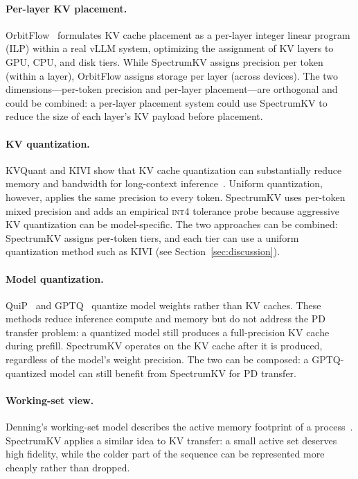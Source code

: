 \documentclass[11pt]{article}
\newcommand{\method}{SpectrumKV}
\newcommand{\intiv}{\textsc{int4}}
\theoremstyle{plain}
\theoremstyle{definition}
\begin{document}
\paragraph{Per-layer KV placement.}
OrbitFlow~\citep{orbitflow} formulates KV cache placement as a per-layer integer linear program (ILP) within a real vLLM system, optimizing the assignment of KV layers to GPU, CPU, and disk tiers.  While \method{} assigns precision per token (within a layer), OrbitFlow assigns storage per layer (across devices).  The two dimensions---per-token precision and per-layer placement---are orthogonal and could be combined: a per-layer placement system could use \method{} to reduce the size of each layer's KV payload before placement.

\paragraph{KV quantization.}
KVQuant and KIVI show that KV cache quantization can substantially reduce memory and bandwidth for long-context inference~\citep{kvquant,kivi}.  Uniform quantization, however, applies the same precision to every token.  \method{} uses per-token mixed precision and adds an empirical \intiv{} tolerance probe because aggressive KV quantization can be model-specific.  The two approaches can be combined: \method{} assigns per-token tiers, and each tier can use a uniform quantization method such as KIVI (see Section~\ref{sec:discussion}).

\paragraph{Model quantization.}
QuiP~\citep{quip} and GPTQ~\citep{gptq} quantize model weights rather than KV caches.  These methods reduce inference compute and memory but do not address the PD transfer problem: a quantized model still produces a full-precision KV cache during prefill.  \method{} operates on the KV cache after it is produced, regardless of the model's weight precision.  The two can be composed: a GPTQ-quantized model can still benefit from \method{} for PD transfer.

\paragraph{Working-set view.}
Denning's working-set model describes the active memory footprint of a process~\citep{denning1968working}.  \method{} applies a similar idea to KV transfer: a small active set deserves high fidelity, while the colder part of the sequence can be represented more cheaply rather than dropped.
\end{document}
